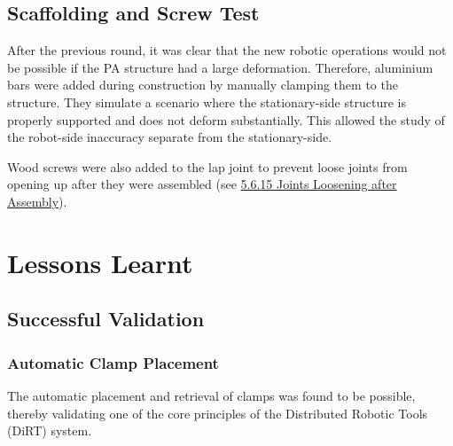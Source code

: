 


\subsection{Scaffolding and Screw Test}

After the previous round, it was clear that the new robotic operations would not be possible if the PA structure had a large deformation. Therefore, aluminium bars were added during construction by manually clamping them to the structure. They simulate a scenario where the stationary-side structure is properly supported and does not deform substantially. This allowed the study of the robot-side inaccuracy separate from the stationary-side.




Wood screws were also added to the lap joint to prevent loose joints from opening up after they were assembled (see \ul{5.6.15 Joints Loosening after Assembly}). 

\section{Lessons Learnt}

\subsection{Successful Validation}

\subsubsection{Automatic Clamp Placement}

The automatic placement and retrieval of clamps was found to be possible, thereby validating one of the core principles of the Distributed Robotic Tools (DiRT) system. 

